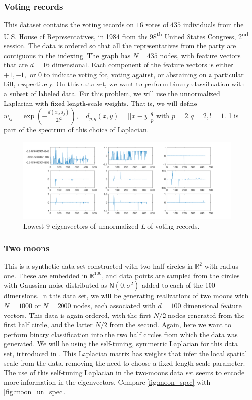 \documentclass{siamart1116}
\begin{document}
        \subsubsection{Voting records}
            This dataset contains the voting records on $16$ votes of $435$ individuals from the U.S. House of Representatives, in 1984 from the 98\textsuperscript{th} United States Congress, 2\textsuperscript{nd} session. The data is ordered so that all the representatives from the party are contiguous in the indexing. The graph has $N=435$ nodes, with feature vectors that are $d=16$ dimensional. Each component of the feature vectors is either $+1,-1,$ or $0$ to indicate voting for, voting against, or abstaining on a particular bill, respectively. On this data set, we want to perform binary classification with a subset of labeled data. For this problem, we will use the unnormalized Laplacian with fixed length-scale weights. That is, we will define $w_{ij} = \exp\left({-\frac{d(x_i,x_j)}{2l^2}}\right), \quad d_{p,q}(x,y) = ||x-y||^q_p$ with $p=2,q=2,l=1$. \cref{fig:voting_spec} is part of the spectrum of this choice of Laplacian.

            \begin{figure}[!htb]
            \centering
            \caption{\label{fig:voting_spec} Lowest $9$ eigenvectors of unnormalized $L$ of voting records.}
            \includegraphics[width=0.5\linewidth]{laplacians/voting_laplacian.png}
            \end{figure}

        \subsubsection{Two moons}
            This is a synthetic data set constructed with two half circles in $\mathbb{R}^2$ with radius one. These are embedded in $\mathbb{R}^{100}$, and data points are sampled from the circles with Gaussian noise distributed as $\mathsf{N}(0,\sigma^2)$ added to each of the 100 dimensions. In this data set, we will be generating realizations of two moons with $N=1000$ or $N=2000$ nodes, each associated with $d=100$ dimensional feature vectors. This data is again ordered, with the first $N/2$ nodes generated from the first half circle, and the latter $N/2$ from the second. Again, here we want to perform binary classification into the two half circles from which the data was generated. We will be using the self-tuning, symmetric Laplacian for this data set, introduced in \cite{SelfTuning}. This Laplacian matrix has weights that infer the local spatial scale from the data, removing the need to choose a fixed length-scale parameter. The use of this self-tuning Laplacian in the two-moons data set seems to encode more information in the eigenvectors. Compare \cref{fig:moon_spec} with \cref{fig:moon_un_spec}.
\end{document}
